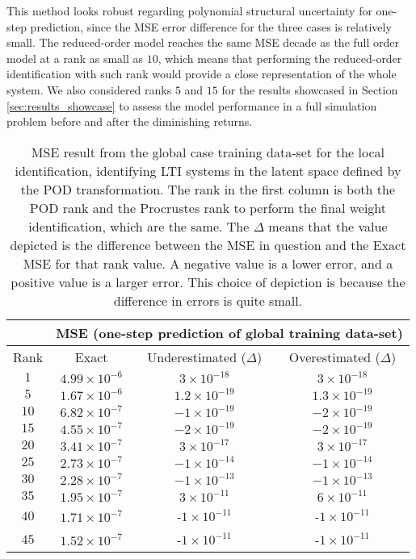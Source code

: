 This method looks robust regarding polynomial structural uncertainty for one-step prediction, since the MSE error difference for the three cases is relatively small.
%
The reduced-order model reaches the same MSE decade as the full order model at a rank as small as $10$, which means that performing the reduced-order identification with such rank would provide a close representation of the whole system.
%
We also considered ranks $5$ and $15$ for the results showcased in Section \ref{sec:results_showcase} to assess the model performance in a full simulation problem before and after the diminishing returns. 


\begin{table}[htb]
    \caption{MSE result from the global case training data-set for the local identification, identifying LTI systems in the latent space defined by the POD transformation. The rank in the first column is both the POD rank and the Procrustes rank to perform the final weight identification, which are the same. The $\Delta$ means that the value depicted is the difference between the MSE in question and the Exact MSE for that rank value. A negative value is a lower error, and a positive value is a larger error.
        This choice of depiction is because the difference in errors is quite small.}
    \label{tab:local_result_linear2}

    \centering
    \begin{tabular}{|c|c|c|c|}
     \cline{2-4}
     \multicolumn{1}{c}{}   & \multicolumn{3}{|c|}{MSE (one-step prediction of global training data-set)} \\\hline
      Rank & Exact & Underestimated ($\Delta$) & Overestimated ($\Delta$)\\\hline
      $1$ & $4.99\times 10^{-6}$& $3\times 10^{-18}$ & $3\times 10^{-18}$ \\ \hline
      $5$ & $1.67\times 10^{-6}$ & $1.2\times 10^{-19} $& $1.3\times 10^{-19} $ \\ \hline 
      $10$ & $6.82\times 10^{-7}$ & $-1\times 10^{-19}$  & $-2\times 10^{-19}$\\ \hline 
      $15$ &$ 4.55\times 10^{-7}$ & $-2\times 10^{-19}$ & $-2\times 10^{-19}$ \\ \hline 
      $20$ & $3.41\times 10^{-7}$ & $3\times 10^{-17}$ & $3\times 10^{-17}$ \\ \hline
      $25$ & $2.73\times 10^{-7}$ &$-1\times 10^{-14}$& $-1\times 10^{-14}$ \\ \hline
      $30$ & $2.28 \times 10^{-7}$ &$-1\times 10^{-13}$ & $-1\times 10^{-13}$\\ \hline
      $35$ & $1.95\times 10^{-7} $&$3\times 10^{-11}$ & $ 6\times 10^{-11} $\\ \hline
      $40$ & $1.71\times 10^{-7}$ & -$1\times 10^{-11}$ & -$1\times 10^{-11}$\\ \hline
      $45$  & $1.52\times 10^{-7}$ & -$1\times 10^{-11}$ & -$1\times 10^{-11}$ \\
      \hline
    \end{tabular}
\end{table}

